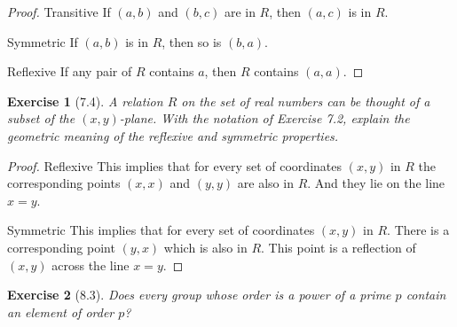 \documentclass[12pt,leqno]{article}
\numberwithin{equation}{section}
\newtheorem*{exer}{Exercise}
\theoremstyle{definition}
\begin{document}
\begin{proof}[Proof]

\item[Transitive] If $(a, b)$ and $(b, c)$ are in $R$, then $(a, c)$ is in $R$.

\item[Symmetric] If $(a, b)$ is in $R$, then so is $(b, a)$.

\item[Reflexive] If any pair of $R$ contains $a$, then $R$ contains $(a, a)$.

\end{proof}


\begin{exer}[7.4] 
A relation $R$ on the set of real numbers can be thought of a subset of the
$(x,y)$-plane. With the notation of Exercise 7.2, explain the geometric meaning
of the reflexive and symmetric properties.

\end{exer}

\begin{proof}[Proof]

\item[Reflexive] This implies that for every set of coordinates $(x, y)$ in $R$
    the corresponding points $(x, x)$ and $(y, y)$ are also in $R$. And they
    lie on the line $x = y$.

\item[Symmetric] This implies that for every set of coordinates $(x, y)$ in
    $R$. There is a corresponding point $(y, x)$ which is also in $R$. This
    point is a reflection of $(x, y)$ across the line $x = y$. 

\end{proof}


\begin{exer}[8.3] Does every group whose order is a power of a prime $p$
    contain an element of order $p$?

\end{exer}
\end{document}
